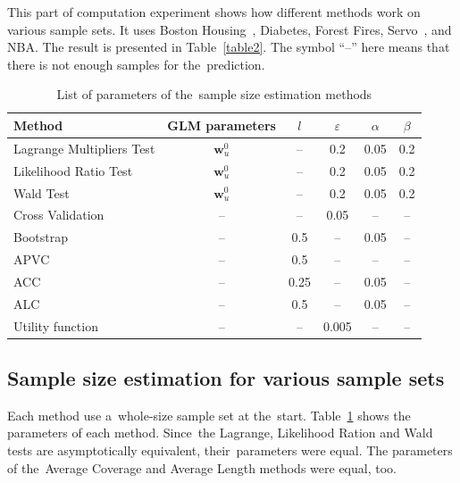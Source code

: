 \documentclass[
11pt,%
tightenlines,%
twoside,%
onecolumn,%
nofloats,%
nobibnotes,%
nofootinbib,%
superscriptaddress,%
noshowpacs,%
centertags]%
{revtex4}
\begin{document}
This part of computation experiment shows how different methods work on various sample sets. It uses Boston Housing~\cite{boston}, Diabetes, Forest Fires, Servo~\cite{servo}, and NBA.
The result is presented in Table~\ref{table2}. The symbol ``--'' here means that there is not enough samples for the~prediction.

\begin{table}[h!bp]
\caption{List of parameters of the~sample size estimation methods}
\label{table3}
\begin{tabular}{l|c|c|c|c|c}
\hline 
Method& GLM parameters& $l$& $\varepsilon$	& $\alpha$& $\beta$\\ 
\hline	
Lagrange	Multipliers Test	& $\mathbf{w}_{u}^0$	& -- & 0.2& 0.05& 0.2\\
\hline	
Likelihood Ratio Test			& $\mathbf{w}_{u}^0$	& -- & 0.2& 0.05& 0.2\\
\hline	
Wald	Test							& $\mathbf{w}_{u}^0$	& -- & 0.2& 0.05& 0.2\\
\hline	
Cross Validation 				& -- & -- 	& 0.05& -- & --\\
\hline	
Bootstrap 							& -- & 0.5	& -- & 0.05& --\\
\hline	
APVC 									& -- & 0.5	& -- & -- & --\\
\hline	
ACC 									& -- & 0.25	& -- & 0.05& --\\
\hline	
ALC 										& -- & 0.5	& -- & 0.05& --\\
\hline	
Utility function 					& -- & -- 	& 0.005& -- & --\\
\hline
\end{tabular}
\end{table}

\subsection{Sample size estimation for various sample sets}
Each method use a~whole-size sample set at the~start. Table~\ref{table3} shows the parameters of each method. Since~the Lagrange, Likelihood Ration and Wald tests are asymptotically equivalent, their~parameters were equal. The parameters of the~Average Coverage and Average Length methods were equal, too.
\end{document}
